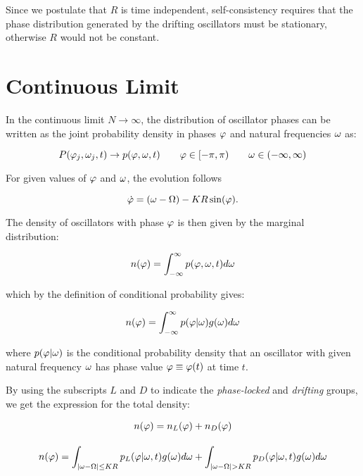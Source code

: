 Since we postulate that $R$ is time independent, self-consistency requires that the phase distribution generated by the drifting
oscillators must be stationary, otherwise $R$ would not be constant.

\section{Continuous Limit}

In the continuous limit $N\to \infty$, the distribution of oscillator phases can be written as the joint probability density in phases
$\varphi$ and natural frequencies $\omega$ as:

\begin{equation*}
	P(\varphi_j, \omega_j,t) \to p(\varphi, \omega,t) \qquad \varphi \in [-\pi, \pi) \qquad \omega \in (-\infty, \infty)
\end{equation*}

\noindent For given values of $\varphi$ and $\omega$, the evolution follows

\begin{equation}
	\dot{\varphi} = (\omega - \Omega) - K R \sin(\varphi).
	\label{eqmotioncontinuous}
\end{equation}

\noindent The density of oscillators with phase $\varphi$ is then given by the marginal distribution:

\begin{align*}
    n(\varphi) = \int_{-\infty}^{\infty} p(\varphi, \omega,t) d\omega
\end{align*}

\noindent which by the definition of conditional probability gives:

\begin{align*}
    n(\varphi) = \int_{-\infty}^{\infty} p(\varphi | \omega)g(\omega) d\omega
\end{align*}

\noindent where $p(\varphi|\omega)$ is the conditional probability density that an oscillator with given natural frequency
$\omega$ has phase value $\varphi \equiv \varphi(t)$ at time $t$.

By using the subscripts $L$ and $D$ to indicate the \textit{phase-locked} and \textit{drifting} groups, we get the expression for the
total density:

\begin{gather}
    n(\varphi) = n_L(\varphi) + n_D(\varphi) \notag\\[10pt]
    n(\varphi) = \int_{|\omega - \Omega|\leq K R} p_L(\varphi|\omega,t) g(\omega) d\omega + \int_{|\omega - \Omega| > K R} p_D(\varphi|\omega,t) g(\omega) d\omega
    \label{density}
\end{gather}

